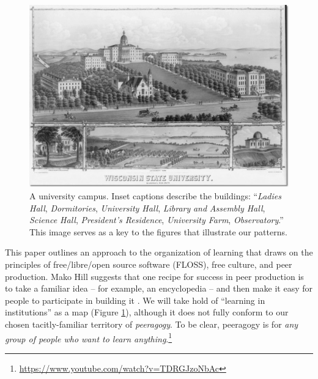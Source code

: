 
\begin{figure}
\vspace{-1.15cm}
\begin{center}
\includegraphics[width=.45\textwidth,trim=0 30 10 2, clip=true]{wisconsin-map}
\end{center}
\vspace{-.4cm}
\captionsetup{font=footnotesize,width=.52\textwidth}
\caption{A university campus.  Inset captions describe the buildings:
  ``\textsl{Ladies Hall}, \textsl{Dormitories}, \textsl{University
    Hall}, \textsl{Library} \textsl{and} \textsl{Assembly Hall},
  \textsl{Science Hall}, \textsl{President's Residence},
  \textsl{University Farm}, \textsl{Observatory}.''  This image serves
  as a key to the figures that illustrate our patterns.\label{madison-map}}
\vspace{-1.5cm}
\end{figure}

This paper  outlines an approach to the organization of learning that draws on the principles of free\slash libre\slash open source software (FLOSS), free culture, and peer production.
Mako Hill suggests that one recipe for success in peer production is to take a familiar idea -- for example, an encyclopedia -- and then make it easy for people to participate in building it \cite[Chapter 1]{mako-thesis}.  We will take hold of ``learning in institutions'' as a map (Figure \ref{madison-map}), although it does not fully conform to our chosen tacitly-familiar territory of \emph{peeragogy}.  To be clear, peeragogy is for \emph{any group of people who want to learn anything}.\footnote{\url{https://www.youtube.com/watch?v=TDRGJzoNbAc}}

